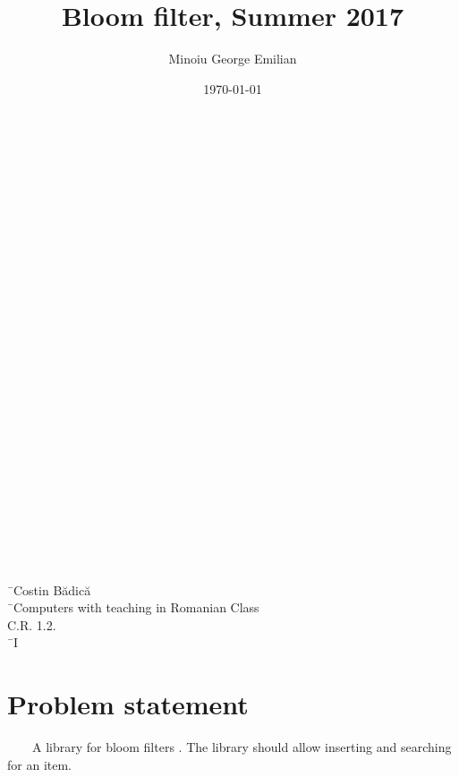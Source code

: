 \documentclass{article}
\begin{document}
\title{Bloom filter, Summer 2017}
\author{Minoiu George Emilian}
\date{\today}
\maketitle

\begin{tabbing}
\\ \\ \\ \\ \\ \\ \\ \\ \\ \\ \\ \\ \\ \\ \\ \\ \\ \\ \\ \\ \\ \\ \\ \\
\end{tabbing}

\begin{tabbing}
  \=\ {Costin B\u{a}dic\u{a}} \\
   \=\  {Computers with teaching in Romanian Class} \\
      \>  C.R. 1.2.  \\
 \=\ {I}

\end{tabbing}

\pagebreak
\section{Problem statement}
\ \ \ \ A library for bloom ﬁlters . The library should allow inserting and searching for an item.
\end{document}
